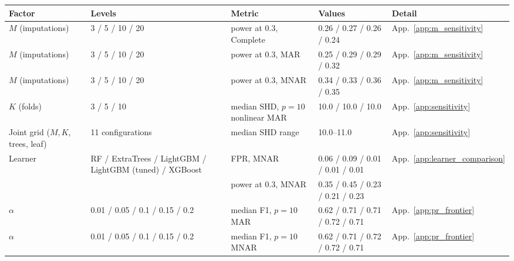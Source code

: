 \begin{tabular}{lllll}
    \toprule
    Factor & Levels & Metric & Values & Detail \\
    \midrule
    $M$ (imputations) & 3 / 5 / 10 / 20 & power at 0.3, Complete & 0.26 / 0.27 / 0.26 / 0.24 & App.~\ref{app:m_sensitivity} \\
    $M$ (imputations) & 3 / 5 / 10 / 20 & power at 0.3, MAR & 0.25 / 0.29 / 0.29 / 0.32 & App.~\ref{app:m_sensitivity} \\
    $M$ (imputations) & 3 / 5 / 10 / 20 & power at 0.3, MNAR & 0.34 / 0.33 / 0.36 / 0.35 & App.~\ref{app:m_sensitivity} \\
    $K$ (folds) & 3 / 5 / 10 & median SHD, $p{=}10$ nonlinear MAR & 10.0 / 10.0 / 10.0 & App.~\ref{app:sensitivity} \\
    Joint grid ($M, K$, trees, leaf) & 11 configurations & median SHD range & 10.0--11.0 & App.~\ref{app:sensitivity} \\
    Learner & RF / ExtraTrees / LightGBM / LightGBM (tuned) / XGBoost & FPR, MNAR & 0.06 / 0.09 / 0.01 / 0.01 / 0.01 & App.~\ref{app:learner_comparison} \\
     &  & power at 0.3, MNAR & 0.35 / 0.45 / 0.23 / 0.21 / 0.23 &  \\
    $\alpha$ & 0.01 / 0.05 / 0.1 / 0.15 / 0.2 & median F1, $p{=}10$ MAR & 0.62 / 0.71 / 0.71 / 0.72 / 0.71 & App.~\ref{app:pr_frontier} \\
    $\alpha$ & 0.01 / 0.05 / 0.1 / 0.15 / 0.2 & median F1, $p{=}10$ MNAR & 0.62 / 0.71 / 0.72 / 0.72 / 0.71 & App.~\ref{app:pr_frontier} \\
    \bottomrule
\end{tabular}
